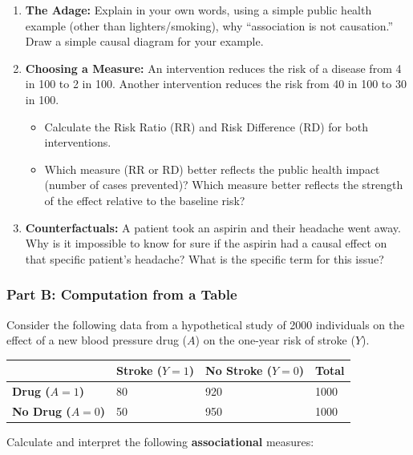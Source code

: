 \documentclass[
  10pt,
  letterpaper,
  DIV=11,
  numbers=noendperiod]{scrartcl}
\providecommand{\tightlist}{%
  \setlength{\itemsep}{0pt}\setlength{\parskip}{0pt}}
\begin{document}
\begin{enumerate}
\def\labelenumi{\arabic{enumi}.}
\tightlist
\item
  \textbf{The Adage:} Explain in your own words, using a simple public
  health example (other than lighters/smoking), why ``association is not
  causation.'' Draw a simple causal diagram for your example.
\item
  \textbf{Choosing a Measure:} An intervention reduces the risk of a
  disease from 4 in 100 to 2 in 100. Another intervention reduces the
  risk from 40 in 100 to 30 in 100.

  \begin{itemize}
  \tightlist
  \item
    Calculate the Risk Ratio (RR) and Risk Difference (RD) for both
    interventions.
  \item
    Which measure (RR or RD) better reflects the public health impact
    (number of cases prevented)? Which measure better reflects the
    strength of the effect relative to the baseline risk?
  \end{itemize}
\item
  \textbf{Counterfactuals:} A patient took an aspirin and their headache
  went away. Why is it impossible to know for sure if the aspirin had a
  causal effect on that specific patient's headache? What is the
  specific term for this issue?
\end{enumerate}

\subsubsection{Part B: Computation from a
Table}\label{part-b-computation-from-a-table}

Consider the following data from a hypothetical study of 2000
individuals on the effect of a new blood pressure drug (\(A\)) on the
one-year risk of stroke (\(Y\)).

\begin{longtable}[]{@{}llll@{}}
\toprule\noalign{}
& Stroke (\(Y=1\)) & No Stroke (\(Y=0\)) & Total \\
\midrule\noalign{}
\endhead
\bottomrule\noalign{}
\endlastfoot
\textbf{Drug (\(A=1\))} & 80 & 920 & 1000 \\
\textbf{No Drug (\(A=0\))} & 50 & 950 & 1000 \\
\end{longtable}

Calculate and interpret the following \textbf{associational} measures:
\end{document}
